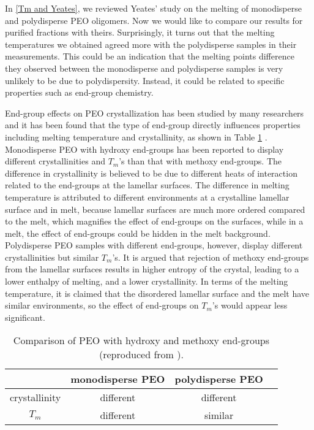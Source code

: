 In \ref{Tm and Yeates}, we reviewed Yeates' study on the melting of monodisperse and polydisperse PEO oligomers. Now we would like to compare our results for purified fractions with theirs. Surprisingly, it turns out that the melting temperatures we obtained agreed more with the polydisperse samples in their measurements. This could be an indication that the melting points difference they observed between the monodisperse and polydisperse samples is very unlikely to be due to polydispersity. Instead, it could be related to specific properties such as end-group chemistry.

End-group effects on PEO crystallization has been studied by many researchers and it has been found that the type of end-group directly influences properties including melting temperature and crystallinity, as shown in Table \ref{tab:end-group effects} \cite{Marshall1981}. Monodisperse PEO with hydroxy end-groups has been reported to display different crystallinities and $T_{m}$'s than that with methoxy end-groups. The difference in crystallinity is believed to be due to different heats of interaction related to the end-groups at the lamellar surfaces. The difference in melting temperature is attributed to different environments at a crystalline lamellar surface and in melt, because lamellar surfaces are much more ordered compared to the melt, which magnifies the effect of end-groups on the surfaces, while in a melt, the effect of end-groups could be hidden in the melt background. Polydisperse PEO samples with different end-groups, however, display different crystallinities but similar $T_{m}$'s. It is argued that rejection of methoxy end-groups from the lamellar surfaces results in higher entropy of the crystal, leading to a lower enthalpy of melting, and a lower crystallinity. In terms of the melting temperature, it is claimed that the disordered lamellar surface and the melt have similar environments, so the effect of end-groups on $T_{m}$'s would appear less significant.
\begin{table}[H]
\centering
	\begin{tabular}{ |c|c|c|c| } 
		\hline
		 & monodisperse PEO & polydisperse PEO \\
		\hline
		\hline
		crystallinity & different & different \\ 
		\hline
		$T_{m}$ & different & similar \\ 
		\hline
	\end{tabular}
	\caption{\label{tab:end-group effects}Comparison of PEO with hydroxy and methoxy end-groups (reproduced from \cite{Marshall1981}).}
\end{table}
